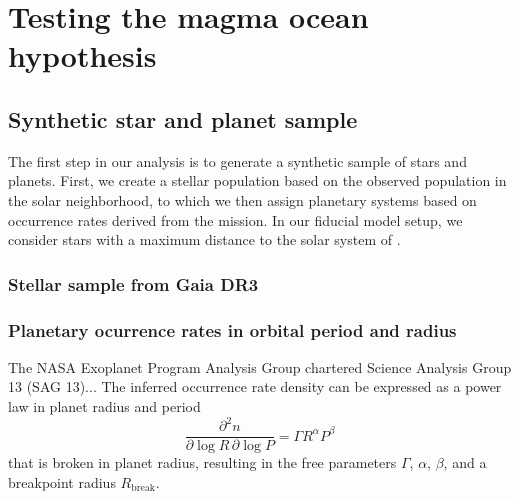 \documentclass[modern]{aastex631}
\begin{document}
\section{Testing the magma ocean hypothesis}

\subsection{Synthetic star and planet sample}
\begin{note}
    The first step in our analysis is to generate a synthetic sample of stars and planets.
    First, we create a stellar population based on the observed population in the solar neighborhood, to which we then assign planetary systems based on occurrence rates derived from the \kepler mission.
    In our fiducial model setup, we consider stars with a maximum distance to the solar system of \dmax.
\end{note}

\subsubsection{Stellar sample from Gaia DR3}

\subsubsection{Planetary ocurrence rates in orbital period and radius}
\begin{note}
    The NASA Exoplanet Program Analysis Group chartered Science Analysis Group 13 (SAG 13)...
    The inferred occurrence rate density can be expressed as a power law in planet radius and period
    \begin{equation}
        \frac{\partial^2n}{\partial \log R \, \partial \log P} = \Gamma R^{\alpha} P^{\beta}
    \end{equation}
that is broken in planet radius, resulting in the free parameters $\Gamma$, $\alpha$, $\beta$, and a breakpoint radius $R_\mathrm{break}$.
\end{note}
\end{document}
